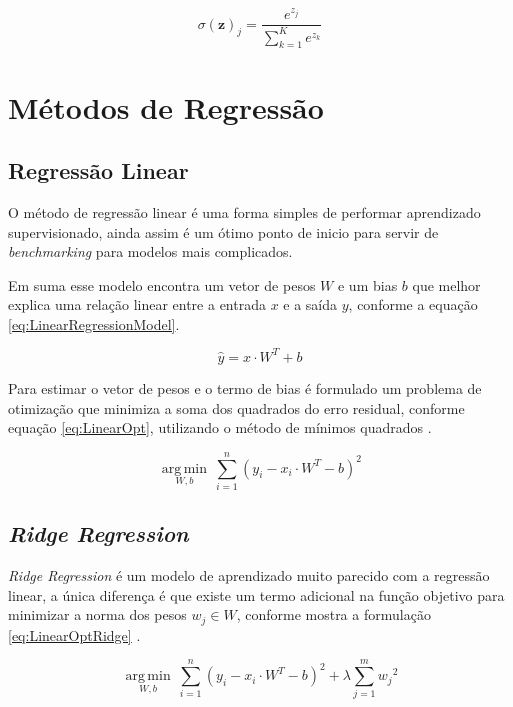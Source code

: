 \begin{equation}
\sigma (\mathbf {z} )_{j}={\frac {e^{z_{j}}}{\sum _{k=1}^{K}e^{z_{k}}}}
\end{equation}

\section{Métodos de Regressão}

\subsection{Regressão Linear}
O método de regressão linear é uma forma simples de performar aprendizado supervisionado, ainda assim é um ótimo ponto de inicio para servir de \textit{benchmarking} para modelos mais complicados. 

Em suma esse modelo encontra um vetor de pesos $W$ e um bias $b$ que melhor explica uma relação linear entre a entrada $x$ e a saída $y$, conforme a equação \ref{eq:LinearRegressionModel}.

\begin{equation}
\hat{y}= {x \cdot W^T} + b
\label{eq:LinearRegressionModel}
\end{equation}

Para estimar o vetor de pesos e o termo de bias é formulado um problema de otimização que minimiza a soma dos quadrados do erro residual, conforme equação  \ref{eq:LinearOpt}, utilizando o método de mínimos quadrados \cite{James20131}.

\begin{equation}
\underset {W, b}{\operatorname {arg\,min} }\ \sum_{i=1}^{n} ({y_i -  x_i \cdot W^T- b })^2
\label{eq:LinearOpt}
\end{equation}

\subsection{\textit{Ridge Regression}}
\textit{Ridge Regression} é um modelo de aprendizado muito parecido com a regressão linear, a única diferença é que existe um termo adicional na função objetivo para minimizar a norma dos pesos $w_j \in W$, conforme mostra a formulação \ref{eq:LinearOptRidge} \cite{James20131} .

\begin{equation}
\underset {W, b}{\operatorname {arg\,min} }\ \sum_{i=1}^{n} ({y_i -  x_i \cdot W^T- b })^2 +  \lambda \sum_{j=1}^{m} {w_j}^2
\label{eq:LinearOptRidge}
\end{equation}

